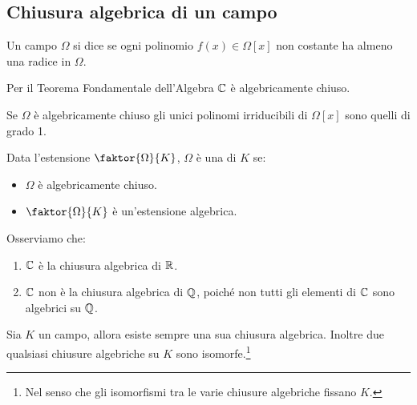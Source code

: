 \documentclass[11pt]{scrartcl}
\begin{document}
\newpage
\subsection{Chiusura algebrica di un campo}
\begin{definition}
    Un campo $\Omega$ si dice  se ogni polinomio $f(x) \in \Omega[x]$ non costante ha almeno una radice in $\Omega$.
\end{definition}

\begin{example}
    Per il Teorema Fondamentale dell'Algebra $\mathbb C$ è algebricamente chiuso.
\end{example}

\begin{remark}
    Se $\Omega$ è algebricamente chiuso gli unici polinomi irriducibili di $\Omega[x]$ sono quelli di grado 1.
\end{remark}

\begin{definition}
    Data l'estensione $\faktor{\Omega}{K}$, $\Omega$ è una  di $K$ se:
    \begin{itemize}
        \item $\Omega$ è algebricamente chiuso.
        \item $\faktor{\Omega}{K}$ è un'estensione algebrica.
    \end{itemize}
\end{definition}

\begin{example}
    Osserviamo che:
    \begin{enumerate}[(1)]
        \item $\mathbb C$ è la chiusura algebrica di $\mathbb R$.
        \item $\mathbb C$ non è la chiusura algebrica di $\mathbb Q$, poiché non tutti gli elementi di $\mathbb C$ sono algebrici su $\mathbb Q$.
    \end{enumerate}
\end{example}

\begin{theorem}
    Sia $K$ un campo, allora esiste sempre una sua chiusura algebrica. Inoltre due qualsiasi chiusure algebriche su $K$ sono isomorfe.\footnote{Nel senso che gli isomorfismi tra le varie chiusure algebriche fissano $K$.}
\end{theorem}
\end{document}
